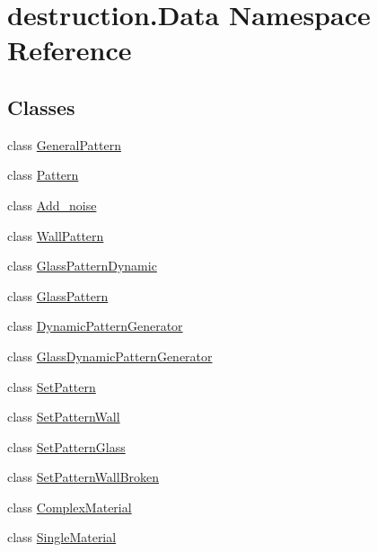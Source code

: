 \hypertarget{namespacedestruction_1_1_data}{\section{destruction.\-Data Namespace Reference}
\label{namespacedestruction_1_1_data}
}
\subsection*{Classes}
\begin{DoxyCompactItemize}
\item 
class \hyperlink{classdestruction_1_1_data_1_1_general_pattern}{General\-Pattern}
\item 
class \hyperlink{classdestruction_1_1_data_1_1_pattern}{Pattern}
\item 
class \hyperlink{classdestruction_1_1_data_1_1_add__noise}{Add\-\_\-noise}
\item 
class \hyperlink{classdestruction_1_1_data_1_1_wall_pattern}{Wall\-Pattern}
\item 
class \hyperlink{classdestruction_1_1_data_1_1_glass_pattern_dynamic}{Glass\-Pattern\-Dynamic}
\item 
class \hyperlink{classdestruction_1_1_data_1_1_glass_pattern}{Glass\-Pattern}
\item 
class \hyperlink{classdestruction_1_1_data_1_1_dynamic_pattern_generator}{Dynamic\-Pattern\-Generator}
\item 
class \hyperlink{classdestruction_1_1_data_1_1_glass_dynamic_pattern_generator}{Glass\-Dynamic\-Pattern\-Generator}
\item 
class \hyperlink{classdestruction_1_1_data_1_1_set_pattern}{Set\-Pattern}
\item 
class \hyperlink{classdestruction_1_1_data_1_1_set_pattern_wall}{Set\-Pattern\-Wall}
\item 
class \hyperlink{classdestruction_1_1_data_1_1_set_pattern_glass}{Set\-Pattern\-Glass}
\item 
class \hyperlink{classdestruction_1_1_data_1_1_set_pattern_wall_broken}{Set\-Pattern\-Wall\-Broken}
\item 
class \hyperlink{classdestruction_1_1_data_1_1_complex_material}{Complex\-Material}
\item 
class \hyperlink{classdestruction_1_1_data_1_1_single_material}{Single\-Material}
\end{DoxyCompactItemize}
